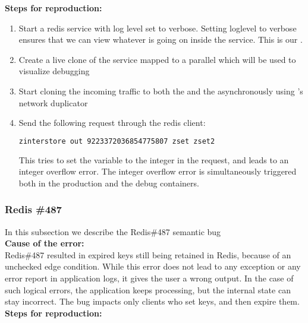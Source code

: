 \noindent \textbf{Steps for reproduction:}\\

\begin{adjustwidth}{0.5cm}{}
\begin{enumerate}
	\item Start a redis service with log level set to verbose. Setting loglevel to verbose ensures that we can view whatever is going on inside the service. This is our \productioncontainer.
	\item Create a live clone of the service mapped to a parallel \debugcontainer which will be used to visualize debugging
	\item Start cloning the incoming traffic to both the \productioncontainer and the \debugcontainer asynchronously using \parikshan's network duplicator
	\item Send the following request through the redis client: 
	
		\begin{lstlisting}[language=sh]
		zinterstore out 9223372036854775807 zset zset2
		\end{lstlisting}
		
		This tries to set the variable to the integer in the request, and leads to an integer overflow error. The integer overflow error is simultaneously triggered both in the production and the debug containers.
	
\end{enumerate}
\end{adjustwidth}


\subsubsection{Redis \#487}

In this subsection we describe the Redis\#487 semantic bug \\

\noindent \textbf{Cause of the error:} \\

Redis\#487 resulted in expired keys still being retained in Redis, because of an unchecked edge condition.
While this error does not lead to any exception or any error report in application logs, it gives the user a wrong output.
In the case of such logical errors, the application keeps processing, but the internal state can stay incorrect.
The bug impacts only clients who set keys, and then expire them.\\

\noindent \textbf{Steps for reproduction:} \\


